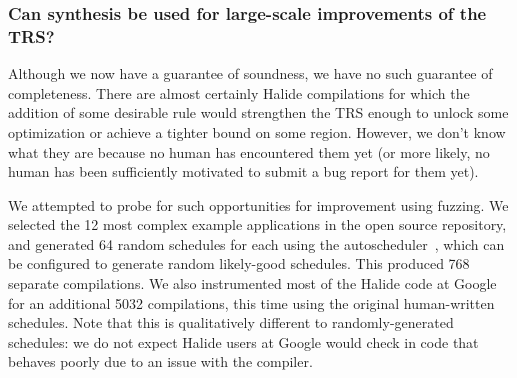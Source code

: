 \documentclass[acmsmall]{acmart}\settopmatter{}
\begin{document}
\subsubsection{Can synthesis be used for large-scale improvements of the TRS?\nopunct}
\label{sub:endtoendexperiment}


Although we now have a guarantee of soundness, we have no such guarantee of completeness. There are almost certainly Halide compilations for which the addition of some desirable rule would strengthen the TRS enough to unlock some optimization or achieve a tighter bound on some region. However, we don’t know what they are because no human has encountered them yet (or more likely, no human has been sufficiently motivated to submit a bug report for them yet). 

We attempted to probe for such opportunities for improvement using fuzzing. We selected the 12 most complex example applications in the open source repository, and generated 64 random schedules for each using the autoscheduler~\cite{Adams2019}, which can be configured to generate random likely-good schedules. This produced 768 separate compilations. We also instrumented most of the Halide code at Google for an additional 5032 compilations, this time using the original human-written schedules. Note that this is qualitatively different to randomly-generated schedules: we do not expect Halide users at Google would check in code that behaves poorly due to an issue with the compiler.
\end{document}
